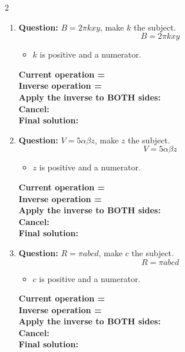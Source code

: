 \documentclass[11pt]{article}
\begin{document}
\begin{multicols}{2}
\begin{enumerate}[leftmargin=*, itemsep=10pt]
\newpage
\item \textbf{Question:} \( B = 2\pi kxy \), make \( k \) the subject.
\[
B=2\pi kxy
\]
\begin{itemize}[leftmargin=*, itemsep=2pt]
\item \(k\) is positive and a numerator.
\end{itemize}
\textbf{Current operation =} \\[1cm]
\textbf{Inverse operation =} \\[1cm]
\textbf{Apply the inverse to BOTH sides:} \\[1.5cm]
\textbf{Cancel:} \\[1.5cm]
\textbf{Final solution:}\\[1.5cm]

\item \textbf{Question:} \( V = 5\alpha\beta z \), make \( z \) the subject.
\[
V=5\alpha\beta z
\]
\begin{itemize}[leftmargin=*, itemsep=2pt]
\item \(z\) is positive and a numerator.
\end{itemize}
\textbf{Current operation =} \\[1cm]
\textbf{Inverse operation =} \\[1cm]
\textbf{Apply the inverse to BOTH sides:} \\[1.5cm]
\textbf{Cancel:} \\[1.5cm]
\textbf{Final solution:}\\[1.5cm]

\columnbreak
\item \textbf{Question:} \( R = \pi a b c d \), make \( c \) the subject.
\[
R=\pi abcd
\]
\begin{itemize}[leftmargin=*, itemsep=2pt]
\item \(c\) is positive and a numerator.
\end{itemize}
\textbf{Current operation =} \\[1cm]
\textbf{Inverse operation =} \\[1cm]
\textbf{Apply the inverse to BOTH sides:} \\[1.5cm]
\textbf{Cancel:} \\[1.5cm]
\textbf{Final solution:}\\[1.5cm]


\end{enumerate}
\end{multicols}
\end{document}
